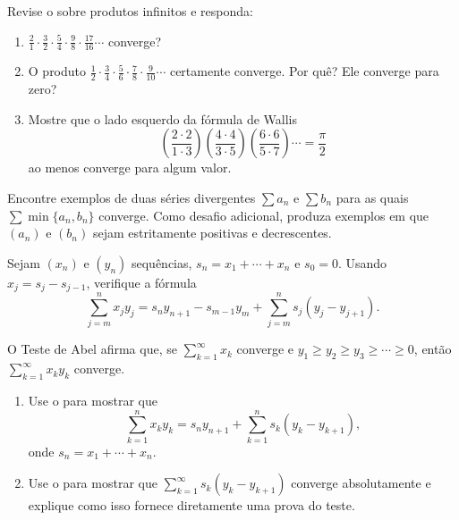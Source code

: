 \begin{exercise}\label{ex:2-7-10}
Revise o  sobre produtos infinitos e responda:
\begin{enumerate}[label=\alph*)]
\item $\displaystyle\frac21\cdot\frac32\cdot\frac54\cdot\frac98\cdot\frac{17}{16}\cdots$ converge?
\item O produto $\displaystyle\frac12\cdot\frac34\cdot\frac56\cdot\frac78\cdot\frac9{10}\cdots$ certamente converge. Por quê? Ele converge para zero?
\item Mostre que o lado esquerdo da fórmula de Wallis
\[
\left(\frac{2\cdot2}{1\cdot3}\right)\left(\frac{4\cdot4}{3\cdot5}\right)\left(\frac{6\cdot6}{5\cdot7}\right)\cdots=\frac\pi2
\]
ao menos converge para algum valor.
\end{enumerate}
\end{exercise}

\begin{exercise}\label{ex:2-7-11}
Encontre exemplos de duas séries divergentes $\sum a_n$ e $\sum b_n$ para as quais $\sum\min\{a_n,b_n\}$ converge. Como desafio adicional, produza exemplos em que $(a_n)$ e $(b_n)$ sejam estritamente positivas e decrescentes.
\end{exercise}

\begin{exercise}\label{ex:2-7-12}
Sejam $(x_n)$ e $(y_n)$ sequências, $s_n=x_1+\cdots+x_n$ e $s_0=0$. Usando $x_j=s_j-s_{j-1}$, verifique a fórmula
\[
\sum_{j=m}^{n}x_jy_j=s_ny_{n+1}-s_{m-1}y_m+\sum_{j=m}^{n}s_j(y_j-y_{j+1}).
\]
\end{exercise}

\begin{exercise}\label{ex:2-7-13}
O Teste de Abel afirma que, se $\sum_{k=1}^{\infty}x_k$ converge e $y_1\geq y_2\geq y_3\geq\cdots\geq0$, então $\sum_{k=1}^{\infty}x_ky_k$ converge.
\begin{enumerate}[label=\alph*)]
\item Use o  para mostrar que
\[
\sum_{k=1}^{n}x_ky_k=s_ny_{n+1}+\sum_{k=1}^{n}s_k(y_k-y_{k+1}),
\]
onde $s_n=x_1+\cdots+x_n$.
\item Use o  para mostrar que $\sum_{k=1}^{\infty}s_k(y_k-y_{k+1})$ converge absolutamente e explique como isso fornece diretamente uma prova do teste.
\end{enumerate}
\end{exercise}

